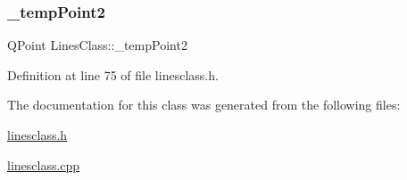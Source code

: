 \subsubsection{\texorpdfstring{\_tempPoint2}{\_tempPoint2}}
{\footnotesize\ttfamily Q\+Point Lines\+Class\+::\+\_\+temp\+Point2\hspace{0.3cm}{\ttfamily [private]}}



Definition at line 75 of file linesclass.\+h.



The documentation for this class was generated from the following files\+:\begin{DoxyCompactItemize}
\item 
\mbox{\hyperlink{linesclass_8h}{linesclass.\+h}}\item 
\mbox{\hyperlink{linesclass_8cpp}{linesclass.\+cpp}}\end{DoxyCompactItemize}
